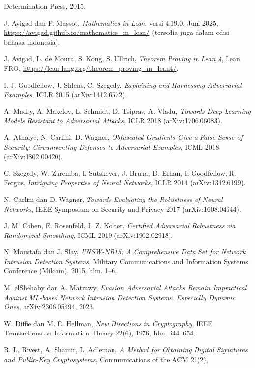 \documentclass[11pt,a4paper,oneside]{book}
\theoremstyle{definition}
\theoremstyle{plain}
\theoremstyle{remark}
\begin{document}
\begin{sloppypar}
\begin{enumerate}[label={[\arabic*]},leftmargin=1.8em]
        Determination Press, 2015.
  \item J. Avigad dan P. Massot, \emph{Mathematics in Lean}, versi 4.19.0, Juni
        2025, \url{https://avigad.github.io/mathematics_in_lean/} (tersedia juga
        dalam edisi bahasa Indonesia).
  \item J. Avigad, L. de Moura, S. Kong, S. Ullrich, \emph{Theorem Proving in
        Lean 4}, Lean FRO, \url{https://lean-lang.org/theorem_proving_in_lean4/}.
  \item I. J. Goodfellow, J. Shlens, C. Szegedy, \emph{Explaining and Harnessing
        Adversarial Examples}, ICLR 2015 (arXiv:1412.6572).
  \item A. Madry, A. Makelov, L. Schmidt, D. Tsipras, A. Vladu,
        \emph{Towards Deep Learning Models Resistant to Adversarial Attacks},
        ICLR 2018 (arXiv:1706.06083).
  \item A. Athalye, N. Carlini, D. Wagner, \emph{Obfuscated Gradients Give a
        False Sense of Security: Circumventing Defenses to Adversarial
        Examples}, ICML 2018 (arXiv:1802.00420).
  \item C. Szegedy, W. Zaremba, I. Sutskever, J. Bruna, D. Erhan, I. Goodfellow,
        R. Fergus, \emph{Intriguing Properties of Neural Networks}, ICLR 2014
        (arXiv:1312.6199).
  \item N. Carlini dan D. Wagner, \emph{Towards Evaluating the Robustness of
        Neural Networks}, IEEE Symposium on Security and Privacy 2017
        (arXiv:1608.04644).
  \item J. M. Cohen, E. Rosenfeld, J. Z. Kolter, \emph{Certified Adversarial
        Robustness via Randomized Smoothing}, ICML 2019 (arXiv:1902.02918).
  \item N. Moustafa dan J. Slay, \emph{UNSW-NB15: A Comprehensive Data Set for
        Network Intrusion Detection Systems}, Military Communications and
        Information Systems Conference (Milcom), 2015, hlm. 1--6.
  \item M. elShehaby dan A. Matrawy, \emph{Evasion Adversarial Attacks Remain
        Impractical Against ML-based Network Intrusion Detection Systems,
        Especially Dynamic Ones}, arXiv:2306.05494, 2023.
  \item W. Diffie dan M. E. Hellman, \emph{New Directions in Cryptography},
        IEEE Transactions on Information Theory 22(6), 1976, hlm. 644--654.
  \item R. L. Rivest, A. Shamir, L. Adleman, \emph{A Method for Obtaining Digital
        Signatures and Public-Key Cryptosystems}, Communications of the ACM 21(2),

\end{enumerate}
\end{sloppypar}
\end{document}
